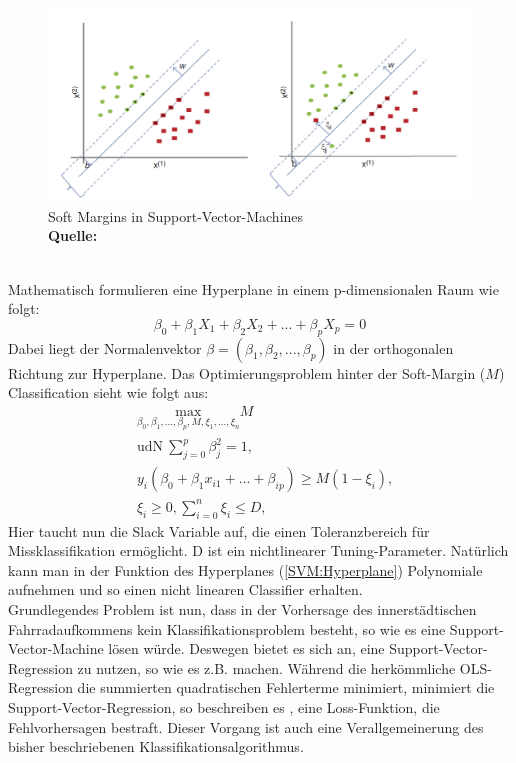 \documentclass[a4paper,12pt]{thesis}
\newcommand*{\captionsource}[2]{%
	\caption[{#1}]{%
		#1%
		\\\hspace{\linewidth}%
		\textbf{Quelle:} #2%
	}%
}
\begin{document}
\begin{figure}[!ht]
	\centering
	\includegraphics[width=\textwidth]{Plots/SVM2.png}
	\captionsource{Soft Margins in Support-Vector-Machines}{
		\cite{Pisner2020}
	}
	\label{SVM2}
\end{figure}\\
Mathematisch formulieren \cite{James2013SVM} eine Hyperplane in einem p-dimensionalen Raum wie folgt:
\begin{equation}
	\label{SVM:Hyperplane}
	\beta_0 + \beta_1 X_1 + \beta_2 X_2 + ... + \beta_p X_p = 0
\end{equation}
Dabei liegt der Normalenvektor $\beta=(\beta_1, \beta_2, ..., \beta_p)$ in der orthogonalen Richtung zur Hyperplane. Das Optimierungsproblem hinter der Soft-Margin ($M$) Classification sieht wie folgt aus:
\begin{equation}
	\label{SVM:SoftMarginClassifier}
	\begin{aligned}
		&\underset{\beta_0, \beta_1, ... , \beta_p,M,\xi_1,...,\xi_n}{\text{max}}M \\
		&\text{udN}\: \sum_{j=0}^p\beta_j^2=1, \\
		&y_i(\beta_0 + \beta_1 x_{i1} + ... + \beta_{ip}) \geq M(1-\xi_i),\\
		&\xi_i \geq 0, \sum_{i=0}^n\xi_i \leq D,
	\end{aligned} 
\end{equation}
Hier taucht nun die Slack Variable auf, die einen Toleranzbereich für Missklassifikation ermöglicht. D ist ein nichtlinearer Tuning-Parameter. Natürlich kann man in der Funktion des Hyperplanes (\ref{SVM:Hyperplane}) Polynomiale aufnehmen und so einen nicht linearen Classifier erhalten.\\
Grundlegendes Problem ist nun, dass in der Vorhersage des innerstädtischen Fahrradaufkommens kein Klassifikationsproblem besteht, so wie es eine Support-Vector-Machine lösen würde. Deswegen bietet es sich an, eine Support-Vector-Regression zu nutzen, so wie es z.B. \cite{Holmgren2017} machen. Während die herkömmliche OLS-Regression die summierten quadratischen Fehlerterme minimiert, minimiert die Support-Vector-Regression, so beschreiben es \cite{Awad2015}, eine Loss-Funktion, die Fehlvorhersagen bestraft. Dieser Vorgang ist auch eine Verallgemeinerung des bisher beschriebenen Klassifikationsalgorithmus.\\ 
\end{document}
